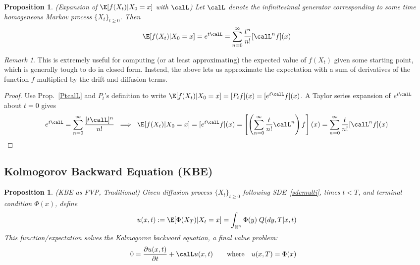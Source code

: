 \documentclass[12pt]{article}
\theoremstyle{plain}
\newtheorem{prop}[thm]{Proposition}
\theoremstyle{definition}
\theoremstyle{remark}
\newtheorem*{rmk}{Remark}
\newcommand{\Rn}{\mathbb{R}^n}
\newcommand{\sumninfz}{\sum^\infty_{n=0}}
\begin{document}
\begin{prop}\emph{(Expansion of $\E[f(X_t)|X_0=x]$ with $\calL$)}
Let $\calL$ denote the infinitesimal generator corresponding to some
time homogeneous Markov process $\{X_t\}_{t\geq 0}$.
Then
\begin{align*}
  \E[f(X_t)|X_0=x]
  =
  e^{t\calL}
  =
  \sumninfz
  \frac{t^n}{n!} [\calL^nf](x)
\end{align*}
\end{prop}
\begin{rmk}
This is extremely useful for computing (or at least approximating) the
expected value of $f(X_t)$ given some starting point, which is generally
tough to do in closed form.
Instead, the above lets us approximate the expectation with a sum of
derivatives of the function $f$ multiplied by the drift and diffusion
terms.
\end{rmk}
\begin{proof}
Use Prop.~\ref{PtcalL} and $P_t$'s definition to write
$\E[f(X_t)|X_0=x] = [P_tf](x) = [ e^{t\calL} f ](x)$.
A Taylor series expansion of $e^{t\calL}$ about $t=0$ gives
\begin{align*}
  e^{t\calL}
  =
  \sumninfz
  \frac{[t\calL]^n}{n!}
  \;\implies\;
  \E[f(X_t)|X_0=x]
  =
  [e^{t\calL}f](x)
  =
  \left[
  \left(
  \sumninfz
  \frac{t}{n!}
  \calL^n
  \right)
  f
  \right]
  (x)
  =
  \sumninfz
  \frac{t}{n!}
  [\calL^n f]
  (x)
\end{align*}
\end{proof}


\clearpage
\subsection{Kolmogorov Backward Equation (KBE)}


\begin{prop}\emph{(KBE as FVP, Traditional)}
\label{prop:kbefvp}
Given diffusion process $\{X_t\}_{t\geq 0}$ following
SDE~\ref{sdemulti}, times $t<T$, and terminal condition $\Phi(x)$,
define
\begin{align}
  u(x,t):=\E[\Phi(X_T)|X_t=x]
  = \int_{\Rn} \Phi(y)\;Q(dy,T|x,t)
  \label{udef}
\end{align}
This function/expectation solves the Kolmogorov backward equation, a
final value problem:
\begin{align}
  0
  &=
  \frac{\partial u(x,t)}{\partial t}
  +
  \calL
  u(x,t)
  \qquad \text{where}\quad
  u(x,T)
  = \Phi(x)
  \label{kbefvp}
\end{align}
\end{prop}
\end{document}
